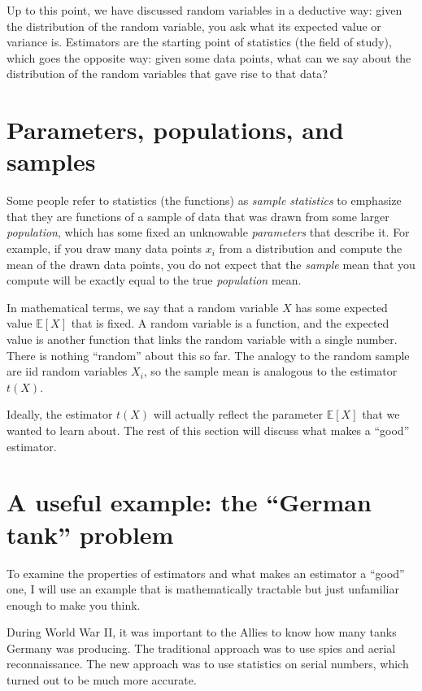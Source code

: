 Up to this point, we have discussed random variables in a deductive way:
given the distribution of the random variable, you ask
what its expected value or variance is. Estimators are the starting point of
statistics (the field of study), which goes the opposite way: given some data
points, what can we say about the distribution of the random variables that gave
rise to that data?

\section{Parameters, populations, and samples}

Some people refer to statistics (the functions) as \emph{sample statistics} to
emphasize that they are functions of a sample of data that was drawn from some
larger \emph{population}, which has some fixed an unknowable \emph{parameters}
that describe it. For example, if you draw many data points $x_i$ from a distribution
and compute the mean of the drawn data points, you do not expect that the
\emph{sample} mean that you compute will be exactly equal to the true
\emph{population} mean.

In mathematical terms, we say that a random variable $X$ has some expected value
$\mathbb{E}[X]$ that is fixed. A random variable is a function, and the expected
value is another function that links the random variable with a single number.
There is nothing ``random'' about this so far. The analogy to the random sample
are iid random variables $X_i$, so the sample mean is analogous to the estimator
$t(X)$.

Ideally, the estimator $t(X)$ will actually reflect the parameter $\mathbb{E}[X]$
that we wanted to learn about. The rest of this section will discuss what makes
a ``good'' estimator.

\section{A useful example: the ``German tank'' problem}

To examine the properties of estimators and what makes an estimator a ``good'' one,
I will use an example that is mathematically tractable but just unfamiliar enough
to make you think.

During World War II, it was important to the Allies to know how many tanks
Germany was producing. The traditional approach was to use spies and aerial
reconnaissance. The new approach was to use statistics on serial numbers,
which turned out to be much more accurate.

